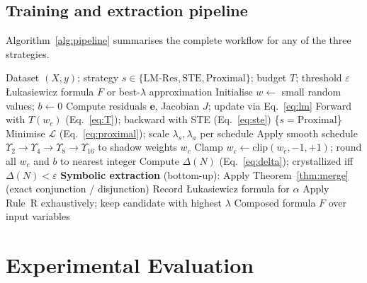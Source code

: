 \documentclass[10pt,a4paper,twoside]{article}
\newcommand{\LNN}{\L{}NN}
\begin{document}
\subsection{Training and extraction pipeline}
\label{ssec:pipeline}

Algorithm~\ref{alg:pipeline} summarises the complete workflow for any of the
three strategies.

\begin{algorithm}
\caption{\LNN{} training and symbolic extraction}
\label{alg:pipeline}
\begin{algorithmic}[1]
\REQUIRE Dataset $(X, y)$; strategy $s \in \{\mathrm{LM\text{-}Res},
         \mathrm{STE}, \mathrm{Proximal}\}$; budget $T$; threshold $\varepsilon$
\ENSURE \L{}ukasiewicz formula $F$ or best-$\lambda$ approximation
\STATE Initialise $w \leftarrow$ small random values; $b \leftarrow 0$
    \STATE Compute residuals $\mathbf{e}$, Jacobian $J$; update via
           Eq.~\eqref{eq:lm}
    \STATE Forward with $T(w_c)$ (Eq.~\eqref{eq:T}); backward with
           STE (Eq.~\eqref{eq:ste})
  \ELSE
    \STATE \{$s = \mathrm{Proximal}$\} Minimise $\mathcal{L}$
           (Eq.~\eqref{eq:proximal}); scale $\lambda_s, \lambda_a$ per schedule
  \ENDIF
    \STATE Apply smooth schedule
           $\Upsilon_2 \!\to\! \Upsilon_4 \!\to\! \Upsilon_8 \!\to\! \Upsilon_{16}$
           to shadow weights $w_c$
  \ENDIF
\ENDFOR
\STATE Clamp $w_c \leftarrow \mathrm{clip}(w_c, -1, +1)$; round all $w_c$
       and $b$ to nearest integer
\STATE Compute $\Delta(N)$ (Eq.~\eqref{eq:delta}); crystallized iff
       $\Delta(N) < \varepsilon$
\STATE \textbf{Symbolic extraction} (bottom-up):
    \STATE Apply Theorem~\ref{thm:merge} (exact conjunction / disjunction)
    \STATE Record \L{}ukasiewicz formula for $\alpha$
  \ELSE
    \STATE Apply Rule~R exhaustively; keep candidate with highest $\lambda$
  \ENDIF
\ENDFOR
\RETURN Composed formula $F$ over input variables
\end{algorithmic}
\end{algorithm}

\section{Experimental Evaluation}
\label{sec:experiments}
\end{document}
